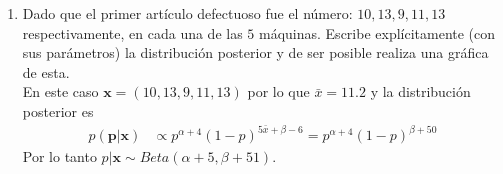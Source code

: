 \documentclass{article}
\begin{document}
\begin{enumerate}
\item Dado que el primer art\'iculo defectuoso fue el n\'umero: $10, 13, 9, 11, 13$ respectivamente, en cada una de las $5$ m\'aquinas. Escribe expl\'icitamente (con sus par\'ametros) la distribuci\'on posterior y de ser posible realiza una gr\'afica de esta. \\ 
En este caso $\mathbf{x} = (10, 13, 9, 11, 13)$ por lo que  $\bar{x} = 11.2$ y la distribuci\'on posterior es
\begin{align*}
p(\mathbf{ p} | \mathbf{x} )  & \propto p ^{\alpha + 4} (1- p)^{5\bar{x} + \beta-6} = p^{\alpha + 4}(1-p)^{\beta  + 50}
\end{align*}
Por lo tanto $p | \mathbf{x} \sim Beta( \alpha + 5,  \beta + 51)$.
\end{enumerate}
\end{document}
